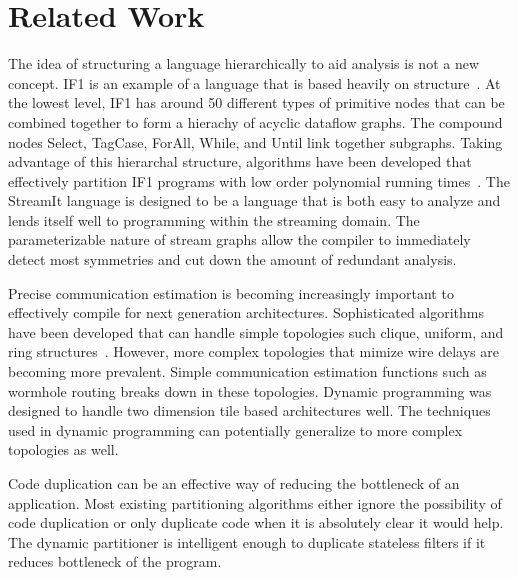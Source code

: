 \section{Related Work}







The idea of structuring a language hierarchically to aid analysis is
not a new concept. IF1 is an example of a language that is based
heavily on structure~\cite{Sked}. At the lowest level, IF1 has around
50 different types of primitive nodes that can be combined together to
form a hierachy of acyclic dataflow graphs. The compound nodes Select,
TagCase, ForAll, While, and Until link together subgraphs. Taking
advantage of this hierarchal structure, algorithms have been developed
that effectively partition IF1 programs with low order polynomial
running times~\cite{Sarker}. The StreamIt language is designed to be a
language that is both easy to analyze and lends itself well to
programming within the streaming domain. The parameterizable nature of
stream graphs allow the compiler to immediately detect most symmetries
and cut down the amount of redundant analysis.

Precise communication estimation is becoming increasingly important to
effectively compile for next generation architectures. Sophisticated
algorithms have been developed that can handle simple topologies such
clique, uniform, and ring structures~\cite{Tao}. However, more complex
topologies that mimize wire delays are becoming more prevalent.
Simple communication estimation functions such as wormhole routing
breaks down in these topologies. Dynamic programming was designed to
handle two dimension tile based architectures well. The techniques
used in dynamic programming can potentially generalize to more complex
topologies as well.

Code duplication can be an effective way of reducing the bottleneck
of an application. Most existing partitioning algorithms either ignore
the possibility of code duplication or only duplicate code when it is
absolutely clear it would help. The dynamic partitioner is intelligent
enough to duplicate stateless filters if it reduces bottleneck
of the program.